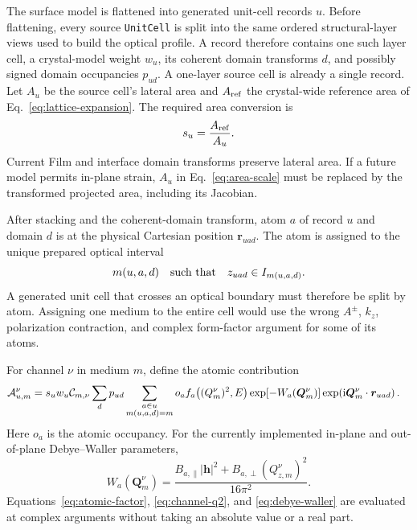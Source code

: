 The surface model is flattened into generated unit-cell records $u$.  Before
flattening, every source \texttt{UnitCell} is split into the same ordered
structural-layer views used to build the optical profile.  A record therefore
contains one such layer cell, a crystal-model weight $w_u$, its coherent domain
transforms $d$, and possibly signed domain occupancies $p_{ud}$.  A one-layer
source cell is already a single record.  Let $A_u$ be the source cell's lateral
area and $A_{\rm ref}$ the crystal-wide reference area of
Eq.~\eqref{eq:lattice-expansion}.  The required area conversion is
\begin{equation}
  s_u=\frac{A_{\rm ref}}{A_u}.
  \label{eq:area-scale}
\end{equation}
Current Film and interface domain transforms preserve lateral area.  If a
future model permits in-plane strain, $A_u$ in Eq.~\eqref{eq:area-scale} must be
replaced by the transformed projected area, including its Jacobian.

After stacking and the coherent-domain transform, atom $a$ of record $u$ and
domain $d$ is at the physical Cartesian position $\bm r_{uad}$.  The atom is
assigned to the unique prepared optical interval
\begin{equation}
  m(u,a,d)\quad\hbox{such that}\quad z_{uad}\in I_{m(u,a,d)}.
  \label{eq:medium-assignment}
\end{equation}
A generated unit cell that crosses an optical boundary must therefore be split
by atom.  Assigning one medium to the entire cell would use the wrong $A^\pm$,
$k_z$, polarization contraction, and complex form-factor argument for some of
its atoms.

For channel $\nu$ in medium $m$, define the atomic contribution
\begin{align}
  \mathcal A_{u,m}^{\nu}
  ={}&s_u w_u\mathcal C_{m,\nu}
  \sum_d p_{ud}
  \sum_{\substack{a\in u\\m(u,a,d)=m}}
  o_a f_a\!\left((Q_m^\nu)^2,E\right)
  \exp\!\left[-W_a\!\left(\bm Q_m^\nu\right)\right]
  \exp\!\left(\mathrm{i}\bm Q_m^\nu\mathbin{\cdot}\bm r_{uad}\right).
  \label{eq:atomic-channel}
\end{align}
Here $o_a$ is the atomic occupancy.  For the currently implemented in-plane
and out-of-plane Debye--Waller parameters,
\begin{equation}
  W_a(\bm Q_m^\nu)
  =\frac{B_{a,\parallel}|\bm h|^2
          +B_{a,\perp}(Q_{z,m}^\nu)^2}{16\pi^2}.
  \label{eq:debye-waller}
\end{equation}
Equations~\eqref{eq:atomic-factor}, \eqref{eq:channel-q2}, and
\eqref{eq:debye-waller} are evaluated at complex arguments without taking an
absolute value or a real part.

